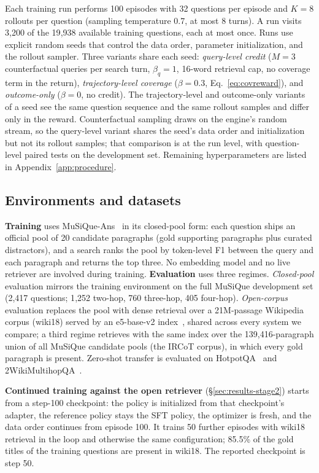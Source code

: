 Each training run performs 100 episodes with 32 questions per episode
and $K=8$ rollouts per question (sampling temperature 0.7, at most 8
turns). A run visits 3{,}200 of the 19{,}938 available training
questions, each at most once. Runs use explicit random seeds that
control the data order, parameter initialization, and the rollout
sampler. Three variants share each seed: \emph{query-level credit}
($M=3$ counterfactual queries per search turn, $\beta_q=1$, 16-word
retrieval cap, no coverage term in the return), \emph{trajectory-level
coverage} ($\beta=0.3$, Eq.~\ref{eq:covreward}), and
\emph{outcome-only} ($\beta=0$, no credit). The trajectory-level and
outcome-only variants of a seed see the same question sequence and the
same rollout samples and differ only in the reward. Counterfactual
sampling draws on the engine's random stream, so the query-level variant
shares the seed's data order and initialization but not its rollout
samples; that comparison is at the run level, with question-level
paired tests on the development set. Remaining hyperparameters are
listed in Appendix~\ref{app:procedure}.

\subsection{Environments and datasets}
\label{sec:setup-data}

\textbf{Training} uses MuSiQue-Ans~\citep{trived2022musique} in its
closed-pool form: each question ships an official pool of 20 candidate
paragraphs (gold supporting paragraphs plus curated distractors), and
a search ranks the pool by token-level F1 between the query and each
paragraph and returns the top three. No embedding model and no live
retriever are involved during training. \textbf{Evaluation} uses three
regimes. \emph{Closed-pool} evaluation mirrors the training environment
on the full MuSiQue development set (2{,}417 questions; 1{,}252 two-hop,
760 three-hop, 405 four-hop). \emph{Open-corpus} evaluation replaces the
pool with dense retrieval over a 21M-passage Wikipedia corpus
(wiki18) served by an e5-base-v2 index~\citep{wang2024text,Jin2025flashrag},
shared across every system we compare; a third regime retrieves with
the same index over the 139{,}416-paragraph union of all MuSiQue
candidate pools (the IRCoT corpus), in which every gold paragraph is
present. Zero-shot transfer is evaluated on
HotpotQA~\citep{yang2018hotpotqa} and
2WikiMultihopQA~\citep{ho2020constructing}.

\textbf{Continued training against the open retriever}
(\S\ref{sec:results-stage2}) starts from a step-100 checkpoint: the
policy is initialized from that checkpoint's adapter, the reference
policy stays the SFT policy, the optimizer is fresh, and the data order
continues from episode 100. It trains 50 further episodes with wiki18
retrieval in the loop and otherwise the same configuration; 85.5\% of
the gold titles of the training questions are present in wiki18. The
reported checkpoint is step 50.

